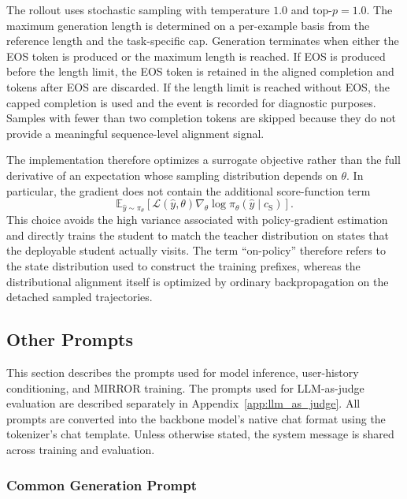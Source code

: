 \documentclass{article} %
\begin{document}
The rollout uses stochastic sampling with temperature $1.0$ and
$\mathrm{top}\text{-}p=1.0$. The maximum generation length is determined on
a per-example basis from the reference length and the task-specific cap.
Generation terminates when either the EOS token is produced or the maximum
length is reached. If EOS is produced before the length limit, the EOS token
is retained in the aligned completion and tokens after EOS are discarded.
If the length limit is reached without EOS, the capped completion is used and
the event is recorded for diagnostic purposes. Samples with fewer than two
completion tokens are skipped because they do not provide a meaningful
sequence-level alignment signal.

The implementation therefore optimizes a surrogate objective rather than the
full derivative of an expectation whose sampling distribution depends on
$\theta$. In particular, the gradient does not contain the additional
score-function term
\begin{equation}
    \mathbb{E}_{\hat{y}\sim\pi_\theta}
    \left[
        \mathcal{L}(\hat{y},\theta)
        \nabla_\theta\log\pi_\theta(\hat{y}\mid c_{\mathrm{S}})
    \right].
\end{equation}
This choice avoids the high variance associated with policy-gradient
estimation and directly trains the student to match the teacher distribution
on states that the deployable student actually visits. The term
``on-policy'' therefore refers to the state distribution used to construct
the training prefixes, whereas the distributional alignment itself is
optimized by ordinary backpropagation on the detached sampled trajectories.

\subsection{Other Prompts}
\label{app:other_prompts}

This section describes the prompts used for model inference, user-history conditioning, and MIRROR training. The prompts used for LLM-as-judge evaluation are described separately in Appendix~\ref{app:llm_as_judge}. All prompts are converted into the backbone model's native chat format using the tokenizer's chat template. Unless otherwise stated, the system message is shared across training and evaluation.

\subsubsection{Common Generation Prompt}
\end{document}
